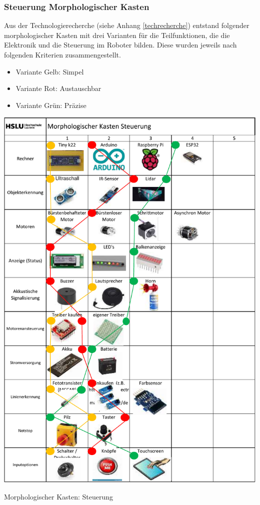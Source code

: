 \subsubsection{Steuerung Morphologischer Kasten}

Aus der Technologierecherche (siehe Anhang \ref{techrecherche}) entstand folgender morphologischer Kasten mit drei Varianten für die Teilfunktionen, die die Elektronik und die Steuerung im Roboter bilden. Diese wurden jeweils nach folgenden Kriterien zusammengestellt.

\begin{itemize}
    \item Variante Gelb: Simpel
    \item Variante Rot: Austauschbar
    \item Variante Grün: Präzise
\end{itemize}


\begin{table}[H]
\centering
\includegraphics[width=\textwidth -5mm]{assets/MK_Elektrotechnik.pdf}
\caption{Morphologischer Kasten: Steuerung}
\label{table:mk-elektrotechnik}
\end{table}

